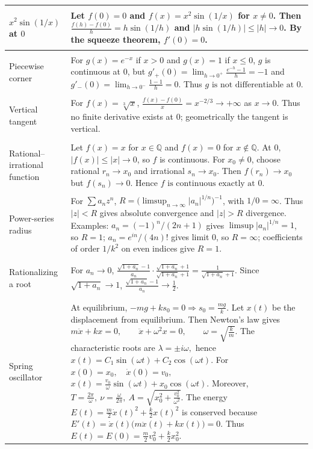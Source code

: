 {\begin{minipage}[t]{0.495\textwidth}
\begin{tabular}{
    @{}
    >{\bfseries\raggedright\arraybackslash}p{2.9cm}
    >{\raggedright\arraybackslash}p{10.5cm}
    @{}
}
\midrule

$x^2\sin(1/x)$ at $0$ &
Let $f(0)=0$ and $f(x)=x^2\sin(1/x)$ for $x\neq0$.
Then
$\frac{f(h)-f(0)}h=h\sin(1/h)$ and
$|h\sin(1/h)|\le|h|\to0$.
By the squeeze theorem,
$\boxed{f'(0)=0}$.
\\

\midrule

Piecewise corner &
For
$g(x)=e^{-x}$ if $x>0$ and $g(x)=1$ if $x\le0$,
$g$ is continuous at $0$, but
$g'_+(0)=\lim_{h\to0^+}\frac{e^{-h}-1}{h}=-1$
and
$g'_-(0)=\lim_{h\to0^-}\frac{1-1}{h}=0$.
Thus $\boxed{g\text{ is not differentiable at }0}$.
\\

\midrule

Vertical tangent &
For $f(x)=\sqrt[3]{x}$,
$\frac{f(x)-f(0)}x=x^{-2/3}\to+\infty$ as $x\to0$.
Thus no finite derivative exists at $0$; geometrically the tangent is
vertical.
\\

\midrule

Rational--irrational function &
Let
$f(x)=x$ for $x\in\mathbb Q$ and
$f(x)=0$ for $x\notin\mathbb Q$.
At $0$, $|f(x)|\le|x|\to0$, so $f$ is continuous.
For $x_0\neq0$, choose rational $r_n\to x_0$ and irrational
$s_n\to x_0$. Then
$f(r_n)\to x_0$ but $f(s_n)\to0$.
Hence $\boxed{f\text{ is continuous exactly at }0}$.
\\

\midrule

Power-series radius &
For $\sum a_nz^n$,
$R=\bigl(\limsup_{n\to\infty}|a_n|^{1/n}\bigr)^{-1}$,
with $1/0=\infty$.
Thus $|z|<R$ gives absolute convergence and $|z|>R$ divergence.
Examples:
$a_n=(-1)^n/(2n+1)$ gives $\limsup|a_n|^{1/n}=1$, so $R=1$;
$a_n=e^{in}/(4n)!$ gives limit $0$, so $R=\infty$;
coefficients of order $1/k^2$ on even indices give $R=1$.
\\

\midrule

Rationalizing a root &
For $a_n\to0$,
$\frac{\sqrt{1+a_n}-1}{a_n}
\cdot
\frac{\sqrt{1+a_n}+1}{\sqrt{1+a_n}+1}
=
\frac{1}{\sqrt{1+a_n}+1}$.
Since $\sqrt{1+a_n}\to1$,
$\boxed{\frac{\sqrt{1+a_n}-1}{a_n}\to\frac12}$.
\\

\midrule

Spring oscillator &
At equilibrium,
$
-mg+ks_0=0
\Rightarrow
s_0=\frac{mg}{k}.
$
Let $x(t)$ be the displacement from equilibrium. Then Newton's law gives
$
m\ddot{x}+kx=0,
\qquad
\ddot{x}+\omega^2x=0,
\qquad
\omega=\sqrt{\frac{k}{m}}.
$
The characteristic roots are
$
\lambda=\pm i\omega,
$
hence
$
x(t)=C_1\sin(\omega t)+C_2\cos(\omega t).
$
For
$
x(0)=x_0,
\quad
\dot{x}(0)=v_0,
$
$
\boxed{
x(t)=\frac{v_0}{\omega}\sin(\omega t)+x_0\cos(\omega t)
}.
$
Moreover,
$
T=\frac{2\pi}{\omega},
\
\nu=\frac{\omega}{2\pi},
\
A=\sqrt{x_0^2+\frac{v_0^2}{\omega^2}}.
$
The energy
$
E(t)=\frac{m}{2}\dot{x}(t)^2+\frac{k}{2}x(t)^2
$
is conserved because
$
E'(t)
=
\dot{x}(t)\bigl(m\ddot{x}(t)+kx(t)\bigr)
=
0.
$
Thus
$
\boxed{
E(t)=E(0)=\frac{m}{2}v_0^2+\frac{k}{2}x_0^2
}.
$
\\


\end{tabular}
\end{minipage}}
